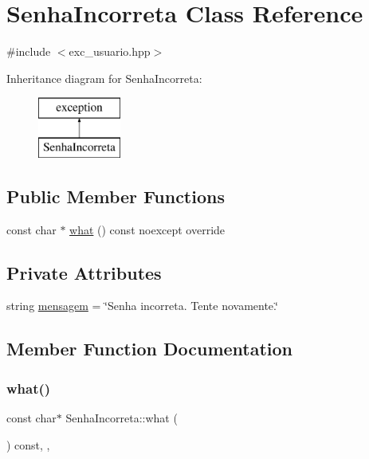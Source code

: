\hypertarget{classSenhaIncorreta}{}\section{Senha\+Incorreta Class Reference}
\label{classSenhaIncorreta}


{\ttfamily \#include $<$exc\+\_\+usuario.\+hpp$>$}

Inheritance diagram for Senha\+Incorreta\+:\begin{figure}[H]
\begin{center}
\leavevmode
\includegraphics[height=2.000000cm]{classSenhaIncorreta}
\end{center}
\end{figure}
\subsection*{Public Member Functions}
\begin{DoxyCompactItemize}
\item 
const char $\ast$ \hyperlink{classSenhaIncorreta_a88aa7d851d1f6e81ef29f5ce3bae0c76}{what} () const noexcept override
\end{DoxyCompactItemize}
\subsection*{Private Attributes}
\begin{DoxyCompactItemize}
\item 
string \hyperlink{classSenhaIncorreta_a79a5b7430df661579c81fd1be29ff66f}{mensagem} = \char`\"{}Senha incorreta. Tente novamente.\char`\"{}
\end{DoxyCompactItemize}


\subsection{Member Function Documentation}
\mbox{\label{classSenhaIncorreta_a88aa7d851d1f6e81ef29f5ce3bae0c76}} 
\subsubsection{\texorpdfstring{what()}{what()}}
{\footnotesize\ttfamily const char$\ast$ Senha\+Incorreta\+::what (\begin{DoxyParamCaption}{ }\end{DoxyParamCaption}) const\hspace{0.3cm}{\ttfamily [inline]}, {\ttfamily [override]}, {\ttfamily [noexcept]}}



